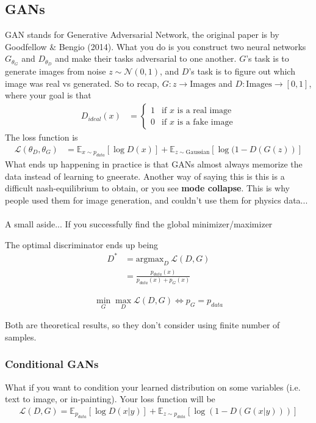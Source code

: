 \subsection{GANs}
GAN stands for Generative Adversarial Network, the original paper is by Goodfellow \& Bengio (2014). What you do is you construct two neural networks $G_{\theta_G}$ and $D_{\theta_D}$ and make their tasks adversarial to one another. $G$'s task is to generate images from noise $z \sim \mathcal N(0,1)$, and $D$'s task is to figure out which image was real vs generated. So to recap, $G: z \to \text{Images}$ and $D: \text{Images} \to [0,1]$, where your goal is that 
\begin{align}
	D_{ideal}(x) & = \begin{cases}
		1 & \text{if } x \text{ is a real image}\\
		0 & \text{if } x \text{ is a fake image}
	\end{cases}
\end{align}
The loss function is
\begin{align}
	\mathcal L(\theta_D, \theta_G) & = \mathbb E_{x \sim p_{data}}[\log D(x)] + \mathbb E_{z \sim \text{Gaussian}}[\log (1 - D(G(z))]
\end{align}
What ends up happening in practice is that GANs almost always memorize the data instead of learning to gneerate. Another way of saying this is this is a difficult nash-equilibrium to obtain, or you see \textbf{mode collapse}. This is why people used them for image generation, and couldn't use them for physics data...\\
\\
A small aside... If you successfully find the global minimizer/maximizer
\begin{lemma}
	The optimal discriminator ends up being
	\begin{align}
		D^* & = \text{argmax}_D ~\mathcal L(D,G)\\
		& = \frac{p_{data}(x)}{p_{data}(x) + p_{G}(x)}
	\end{align}	
\end{lemma}
\begin{theorem}
	\begin{align}
		\min_G \max_D \mathcal L(D,G) \iff p_G = p_{data}
	\end{align}
\end{theorem}
Both are theoretical results, so they don't consider using finite number of samples.

\subsubsection{Conditional GANs} What if you want to condition your learned distribution on some variables (i.e. text to image, or in-painting). Your loss function will be
\begin{align}
	\mathcal L(D,G) = \mathbb E_{p_{data}} [\log D(x | y)] + \mathbb E_{z \sim p_{data}} [\log (1 - D(G(x|y)))]
\end{align}

